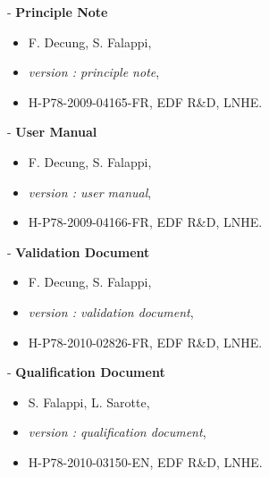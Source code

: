 \begin{list}{-}{}
  \item[-] {\bf Principle Note}
    \begin {itemize}
      \item[] {\sc F. Decung, S. Falappi},
      \item[] {\em  \estel version \rel: principle note},
      \item[] H-P78-2009-04165-FR, EDF R\&D, LNHE.
    \end{itemize}
  \item[-] {\bf User Manual}
    \begin {itemize}
      \item[] {\sc F. Decung, S. Falappi},
      \item[] {\em  \estel version \rel: user manual},
      \item[] H-P78-2009-04166-FR, EDF R\&D, LNHE.
    \end{itemize}
  \item[-] {\bf Validation Document}
    \begin {itemize}
      \item[] {\sc F. Decung, S. Falappi},
      \item[] {\em  \estel version \rel: validation document},
      \item[] H-P78-2010-02826-FR, EDF R\&D, LNHE.
    \end{itemize}
  \item[-] {\bf Qualification Document}
    \begin {itemize}
      \item[] {\sc S. Falappi, L. Sarotte},
      \item[] {\em  \estel version \rel: qualification document},
      \item[] H-P78-2010-03150-EN, EDF R\&D, LNHE.
    \end{itemize}
\end{list}
%
%

